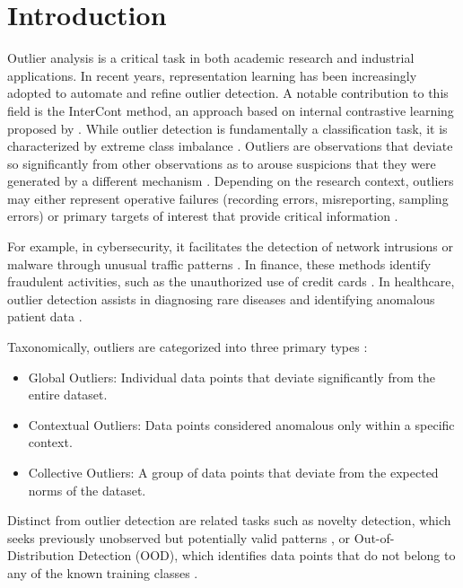 \section{Introduction}\label{sec:introduction}
Outlier analysis is a critical task in both academic research and industrial applications. 
In recent years, representation learning has been increasingly adopted to automate and refine outlier detection. 
A notable contribution to this field is the InterCont method, an approach based on internal contrastive learning proposed by \citet{shenkar2022anomaly}. 
While outlier detection is fundamentally a classification task, it is characterized by extreme class imbalance \citep[p. 2]{saito2015precision}.
Outliers are observations that deviate so significantly from other observations as to arouse suspicions that they were generated by a different mechanism \citep[postfix]{hawkins1980identification}. 
Depending on the research context, outliers may either represent operative failures (recording errors, misreporting, sampling errors) or primary targets of interest that provide critical information \citep{smiti2020critical}.


For example, in cybersecurity, it facilitates the detection of network intrusions or malware through unusual traffic patterns \citep[Chapter 3]{ahmed2016survey}. 
In finance, these methods identify fraudulent activities, such as the unauthorized use of credit cards \citep{malini2017analysis}. 
In healthcare, outlier detection assists in diagnosing rare diseases and identifying anomalous patient data \citep[Chapter 2.3.]{wang2019progress}.


Taxonomically, outliers are categorized into three primary types \citep[Chapter 2.2.1.]{smiti2020critical}:
\begin{itemize}
    \item   Global Outliers: Individual data points that deviate significantly from the entire dataset.
    \item   Contextual Outliers: Data points considered anomalous only within a specific context. 
    \item   Collective Outliers: A group of data points that deviate from the expected norms of the dataset.
\end{itemize}           


Distinct from outlier detection are related tasks such as novelty detection, which seeks previously unobserved but potentially valid patterns \citet{domingues2019probabilistic},
or Out-of-Distribution Detection (OOD), which identifies data points that do not belong to any of the known training classes \citep{yang2024generalized}. 



